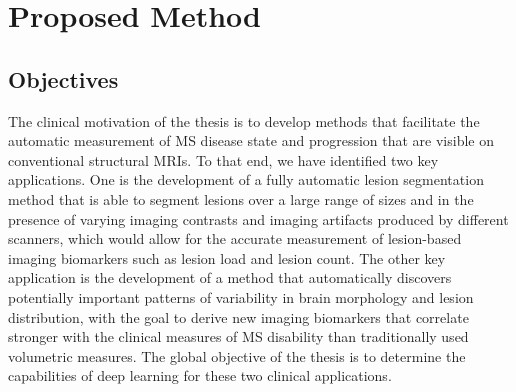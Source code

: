 % 

\section[Proposed method]{Proposed Method}

\subsection{Objectives}


The clinical motivation of the thesis is to develop methods that facilitate the
automatic measurement of MS disease state and progression that are visible on
conventional structural MRIs. To that end, we have identified two key
applications. One is the development of a fully automatic lesion segmentation
method that is able to segment lesions over a large range of sizes and in the
presence of varying imaging contrasts and imaging artifacts produced by
different scanners, which would allow for the accurate measurement of
lesion-based imaging biomarkers such as lesion load and lesion count. The other
key application is the development of a method that automatically discovers
potentially important patterns of variability in brain morphology and lesion
distribution, with the goal to derive new imaging biomarkers that correlate
stronger with the clinical measures of MS disability than traditionally used
volumetric measures. The global objective of the thesis is to determine the
capabilities of deep learning \citep{lecun2015} for these two clinical
applications.

